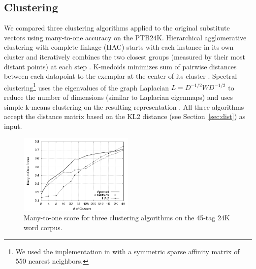 \subsection{Clustering}
\label{sec:clustering}

We compared three clustering algorithms applied to the original
substitute vectors using many-to-one accuracy on the PTB24K.
Hierarchical agglomerative clustering with complete linkage (HAC)
starts with each instance in its own cluster and iteratively combines
the two closest groups (measured by their most distant points) at each
step \cite{manning2008introduction}.  K-medoids minimizes sum of
pairwise distances between each datapoint to the exemplar at the
center of its cluster \cite{kaufman2005finding}.  Spectral
clustering\footnote{We used the implementation in
  \cite{chen2011parallel} with a symmetric sparse affinity matrix of
  550 nearest neighbors.} uses the eigenvalues of the graph Laplacian
$L=D^{-1/2} W D^{-1/2}$ to reduce the number of dimensions (similar to
Laplacian eigenmaps) and uses simple k-means clustering on the
resulting representation \cite{ng2002spectral}.  All three algorithms
accept the distance matrix based on the KL2 distance (see
Section~\ref{sec:dist}) as input.

\begin{figure}[h] \centering
\includegraphics[width=0.5\textwidth]{clustering_graph_mono.png}
\caption{Many-to-one score for three clustering algorithms on the
  45-tag 24K word corpus.}
\label{fig:clustering}
\end{figure}



